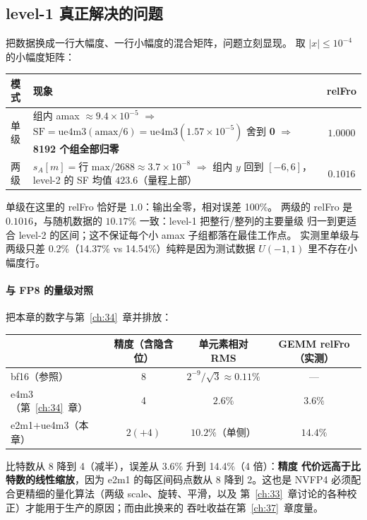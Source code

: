 \subsection{level-1 真正解决的问题}

把数据换成一行大幅度、一行小幅度的混合矩阵，问题立刻显现。
取 $|x|\le10^{-4}$ 的小幅度矩阵：

\begin{center}
\footnotesize
\begin{tabular}{llc}
\toprule
模式 & 现象 & relFro \\
\midrule
单级 & 组内 amax $\approx 9.4\times10^{-5}$
  $\Rightarrow$ $\mathrm{SF}=\mathrm{ue4m3}(\mathrm{amax}/6)
  = \mathrm{ue4m3}(1.57\times10^{-5})$ 舍到 \textbf{0}
  $\Rightarrow$ \textbf{8192 个组全部归零} & $\mathbf{1.0000}$ \\
两级 & $s_A[m] = \text{行 max}/2688 \approx 3.7\times10^{-8}$
  $\Rightarrow$ 组内 $y$ 回到 $[-6,6]$，
  level-2 的 SF 均值 $423.6$（量程上部） & $0.1016$ \\
\bottomrule
\end{tabular}
\end{center}

单级在这里的 relFro 恰好是 $1.0$：输出全零，相对误差 100\%。
两级的 relFro 是 $0.1016$，与随机数据的 $10.17\%$ 一致：level-1 把整行/整列的主要量级
归一到更适合 level-2 的区间；这不保证每个小 amax 子组都落在最佳工作点。
实测里单级与两级只差 $0.2\%$（14.37\% vs 14.54\%）纯粹是因为测试数据
$U(-1,1)$ 里不存在小幅度行。

\paragraph{与 FP8 的量级对照} 把本章的数字与第~\ref{ch:34}~章并排放：

\begin{center}
\footnotesize
\begin{tabular}{lccc}
\toprule
 & 精度（含隐含位） & 单元素相对 RMS & GEMM relFro（实测） \\
\midrule
bf16（参照） & 8 & $2^{-9}/\sqrt3 \approx 0.11\%$ & --- \\
e4m3（第~\ref{ch:34}~章） & 4 & $2.6\%$ & $3.6\%$ \\
e2m1$+$ue4m3（本章） & $2(+4)$ & $10.2\%$（单侧） & $14.4\%$ \\
\bottomrule
\end{tabular}
\end{center}

比特数从 8 降到 4（减半），误差从 3.6\% 升到 14.4\%（4 倍）：\textbf{精度
代价远高于比特数的线性缩放}，因为 e2m1 的每区间码点数从 8 降到 2。这也是
NVFP4 必须配合更精细的量化算法（两级 scale、旋转、平滑，以及
第~\ref{ch:33}~章讨论的各种校正）才能用于生产的原因；而由此换来的
吞吐收益在第~\ref{ch:37}~章度量。

